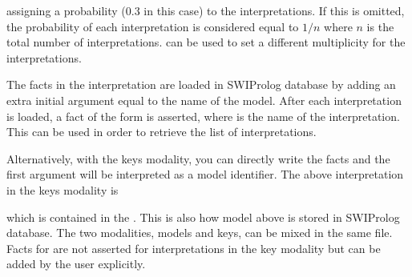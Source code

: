 \documentclass[letterpaper,10pt,english]{sphinxmanual}
\begin{document}
\sphinxAtStartPar
assigning a probability (0.3 in this case) to the interpretations.
If this is omitted, the probability of each interpretation is considered equal to \(1/n\) where \(n\) is the total number of interpretations.  can be used to set a different multiplicity for the interpretations.

\sphinxAtStartPar
The facts in the interpretation are loaded in SWI\sphinxhyphen{}Prolog database by adding an extra initial argument equal to the name of the model.
After each interpretation is loaded, a fact of the form  is asserted, where  is the name of the interpretation.
This can be used in order to retrieve the list of interpretations.

\sphinxAtStartPar
Alternatively, with the keys modality, you can directly write the facts and the first argument will be interpreted as a model identifier.
The above interpretation in the keys modality is

\begin{sphinxVerbatim}[commandchars=\\\{\}]
\end{sphinxVerbatim}

\sphinxAtStartPar
which is contained in the .
This is also how model  above is stored in SWI\sphinxhyphen{}Prolog database.
The two modalities, models and keys, can be mixed in the same file.
Facts for  are not asserted for interpretations in the key modality but can be added by the user explicitly.
\end{document}
